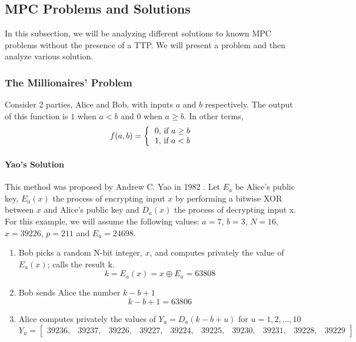 \begin{refsection}
\pagebreak

\subsection{MPC Problems and Solutions}\label{mpcproblemsandsolutions}
In this subsection, we will be analyzing different solutions to known MPC problems without the presence of a TTP. We will present a problem and then analyze various solution.

\subsubsection{The Millionaires' Problem}
Consider 2 parties, Alice and Bob, with inputs $a$ and $b$ respectively. The output of this function is $1$ when $a < b$
and $0$ when $a \geq b$. In other terms,
\[
f(a,b) = \left \{
          \begin{tabular}{ccc}
          0, if $a \geq b$ \\
          1, if $a < b$
          \end{tabular}
        \right.
\]
\paragraph{Yao's Solution}
This method was proposed by Andrew C. Yao in 1982 \cite{yao1982}. Let $E_a$ be Alice's public key, $E_a(x)$ the process of encrypting input $x$ by performing
a bitwise XOR between $x$ and Alice's public key and $D_a(x)$ the process of decrypting input x.
For this example, we will assume the following values: $a = 7$, $b = 3$, $N = 16$, $x = 39226$, $p = 211$ and $E_a = 24698$.

\begin{enumerate}
\item Bob picks a random N-bit integer, $x$, and computes privately the value of $E_a(x)$; calls the result k.
\begin{equation}\label{eq:encryptingX}
k = E_a(x) = x \oplus E_a = 63808
\end{equation}

\item Bob sends Alice the number $k - b + 1$
\begin{equation}\label{eq:encryptingX}
k - b + 1 = 63806
\end{equation}
\item Alice computes privately the values of $Y_u = D_a(k - b + u)$ for $u = 1,2,\ldots,10$\\
\[
Y_u = \begin{bmatrix}
        39236,&39237,&39226,&39227,&39224,&39225,&39230,&39231,&39228,&39229
      \end{bmatrix}
\]


\end{enumerate}
\end{refsection}
